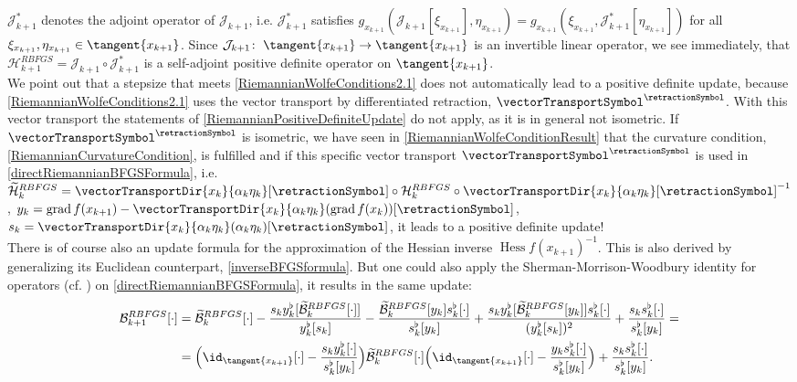 $\mathcal{J}^{*}_{k+1}$ denotes the adjoint operator of $\mathcal{J}_{k+1}$, i.e. $\mathcal{J}^{*}_{k+1}$ satisfies $g_{x_{k+1}}(\mathcal{J}_{k+1}[\xi_{x_{k+1}}], \eta_{x_{k+1}}) = g_{x_{k+1}}(\xi_{x_{k+1}}, \mathcal{J}^{*}_{k+1}[\eta_{x_{k+1}}])$ for all $\xi_{x_{k+1}}, \eta_{x_{k+1}} \in \tangent{x_{k+1}}$. Since $\mathcal{J}_{k+1} \colon \; \tangent{x_{k+1}} \to \tangent{x_{k+1}}$ is an invertible linear operator, we see immediately, that $\mathcal{H}^{RBFGS}_{k+1} = \mathcal{J}_{k+1} \circ \mathcal{J}^{*}_{k+1}$ is a self-adjoint positive definite operator on $\tangent{x_{k+1}}$. \\
We point out that a stepsize that meets \cref{RiemannianWolfeConditions2.1} does not automatically lead to a positive definite update, because \cref{RiemannianWolfeConditions2.1} uses the vector transport by differentiated retraction, $\vectorTransportSymbol^{\retractionSymbol}$. With this vector transport the statements of \cref{RiemannianPositiveDefiniteUpdate} do not apply, as it is in general not isometric. If $\vectorTransportSymbol^{\retractionSymbol}$ is isometric, we have seen in \cref{RiemannianWolfeConditionResult} that the curvature condition, \cref{RiemannianCurvatureCondition}, is fulfilled and if this specific vector transport $\vectorTransportSymbol^{\retractionSymbol}$ is used in \cref{directRiemannianBFGSFormula}, i.e. $\widetilde{\mathcal{H}}^{RBFGS}_k = \vectorTransportDir{x_k}{\alpha_k \eta_k}[\retractionSymbol] \circ \mathcal{H}^{RBFGS}_k \circ {\vectorTransportDir{x_k}{\alpha_k \eta_k}[\retractionSymbol]}^{-1}$, $y_k = \operatorname{grad} f(x_{k+1}) - \vectorTransportDir{x_k}{\alpha_k \eta_k}(\operatorname{grad} f(x_k))[\retractionSymbol]$, $s_k =  \vectorTransportDir{x_k}{\alpha_k \eta_k}(\alpha_k \eta_k)[\retractionSymbol]$, it leads to a positive definite update! \\
There is of course also an update formula for the approximation of the Hessian inverse ${\operatorname{Hess} f(x_{k+1})}^{-1}$. This is also derived by generalizing its Euclidean counterpart, \cref{inverseBFGSformula}. But one could also apply the Sherman-Morrison-Woodbury identity for operators (cf. \cite[Theorem~1.1]{Deng:2011}) on \cref{directRiemannianBFGSFormula}, it results in the same update:
\begin{equation}\label{RiemannianInverseBFGSFormula}
    \begin{split}
        \mathcal{B}^{RBFGS}_{k+1} [\cdot] &= \widetilde{\mathcal{B}}^{RBFGS}_k [\cdot] -  \frac{s_k y^{\flat}_k[\widetilde{\mathcal{B}}^{RBFGS}_k [\cdot]]}{y^{\flat}_k [s_k]} - \frac{\widetilde{\mathcal{B}}^{RBFGS}_k [y_k]  s^{\flat}_k [\cdot]}{s^{\flat}_k [y_k]} + \frac{s_k y^{\flat}_k[\widetilde{\mathcal{B}}^{RBFGS}_k [y_k]]s^{\flat}_k [\cdot]}{(y^{\flat}_k [s_k])^2} + \frac{s_k s^{\flat}_k [\cdot]}{s^{\flat}_k [y_k]} = \\
        &= \Big{(} \id_{\tangent{x_{k+1}}}[\cdot] - \frac{s_k y^{\flat}_k [\cdot]}{s^{\flat}_k [y_k]} \Big{)} \widetilde{\mathcal{B}}^{RBFGS}_k [\cdot] \Big{(} \id_{\tangent{x_{k+1}}}[\cdot] - \frac{y_k s^{\flat}_k [\cdot]}{s^{\flat}_k [y_k]} \Big{)} + \frac{s_k s^{\flat}_k [\cdot]}{s^{\flat}_k [y_k]}.
    \end{split}
\end{equation}
